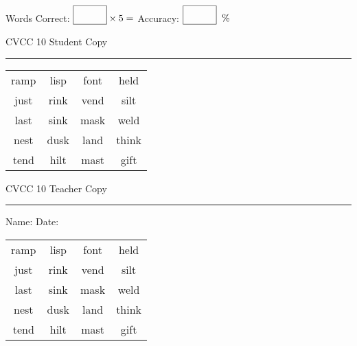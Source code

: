 \documentclass{memoir}
\begin{document}
\small

Words Correct: $\fbox{\phantom{\huge 100}} \times 5 = $ Accuracy: $\fbox{\phantom{\huge 100}}\;\; \%$ 

\vfill

\newpage


\footnotesize \noindent
CVCC 10 \hfill Student Copy
\smallskip
\hrule

\Large

\setlength{\tabcolsep}{14pt}
\def\arraystretch{3}

{\selectfont


\begin{vplace}[0.5]
\begin{center}
\begin{tabular}{cccc}
ramp & lisp & font & held \\
just & rink & vend & silt \\
last & sink & mask & weld \\
nest & dusk & land & think \\
tend & hilt & mast & gift \\
\end{tabular}
\end{center}
\end{vplace}

}

\newpage

\footnotesize \noindent
CVCC 10 \hfill Teacher Copy
\smallskip
\hrule

\small

\vfill

\noindent
Name: \underline{\hspace{1.75in}} \hfill Date: \underline{\hspace{1in}}

\Large

{\selectfont


\begin{vplace}[0.5]
\begin{center}
\begin{tabular}{cccc}
ramp & lisp & font & held \\
just & rink & vend & silt \\
last & sink & mask & weld \\
nest & dusk & land & think \\
tend & hilt & mast & gift \\
\end{tabular}
\end{center}
\end{vplace}



}
\end{document}
